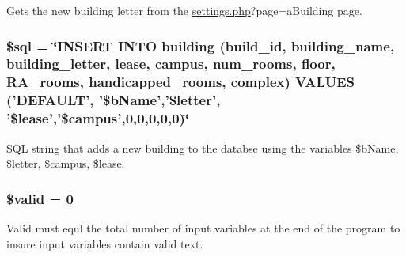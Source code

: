 \-Gets the new building letter from the \hyperlink{settings_8php}{settings.\-php}?page=a\-Building page. \hypertarget{buildingVal_8php_a047170d6020a882807665812a27e2525}{
\subsubsection[{\$sql}]{\setlength{\rightskip}{0pt plus 5cm}\$sql = \char`\"{}\-I\-N\-S\-E\-R\-T \-I\-N\-T\-O building (build\-\_\-id, building\-\_\-name, building\-\_\-letter, lease, campus, num\-\_\-rooms, floor, \-R\-A\-\_\-rooms, handicapped\-\_\-rooms, complex) \-V\-A\-L\-U\-E\-S ('\-D\-E\-F\-A\-U\-L\-T', '\$b\-Name','\$letter', '\$lease','\$campus',0,0,0,0,0)\char`\"{}}}\label{buildingVal_8php_a047170d6020a882807665812a27e2525}
\-S\-Q\-L string that adds a new building to the databse using the variables \$b\-Name, \$letter, \$campus, \$lease. \hypertarget{buildingVal_8php_a0587674d27d00ef497e08e53ccf45bbb}{
\subsubsection[{\$valid}]{\setlength{\rightskip}{0pt plus 5cm}\$valid = 0}}\label{buildingVal_8php_a0587674d27d00ef497e08e53ccf45bbb}
\-Valid must equl the total number of input variables at the end of the program to insure input variables contain valid text. 